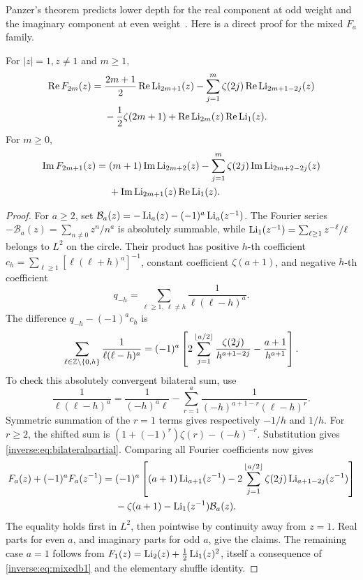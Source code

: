 Panzer's theorem predicts lower depth for the real component at odd
weight and the imaginary component at even weight~\cite{Panzer2017}.
Here is a direct proof for the mixed \(F_a\) family.

\begin{theorem}\label{inverse:thm:mixedparity}
For \(|z|=1,z\ne1\) and \(m\ge1\),
\begin{align}
\operatorname{Re} F_{2m}(z)
={}&\frac{2m+1}{2}\operatorname{Re}\operatorname{Li}_{2m+1}(z)
 -\sum_{j=1}^{m}\zeta(2j)\operatorname{Re}\operatorname{Li}_{2m+1-2j}(z)\notag\\
&-\frac12\zeta(2m+1)
 +\operatorname{Re}\operatorname{Li}_{2m}(z)\operatorname{Re}\operatorname{Li}_1(z).
\label{inverse:eq:realparity}
\end{align}
For \(m\ge0\),
\begin{align}
\operatorname{Im} F_{2m+1}(z)
={}&(m+1)\operatorname{Im}\operatorname{Li}_{2m+2}(z)
 -\sum_{j=1}^{m}\zeta(2j)\operatorname{Im}\operatorname{Li}_{2m+2-2j}(z)\notag\\
&+\operatorname{Im}\operatorname{Li}_{2m+1}(z)\operatorname{Re}\operatorname{Li}_1(z).
\label{inverse:eq:imagparity}
\end{align}
\end{theorem}
\begin{proof}
For \(a\ge2\), set
\(\mathcal B_a(z)=-\operatorname{Li}_a(z)-(-1)^a\operatorname{Li}_a(z^{-1})\).
The Fourier series
\(-\mathcal B_a(z)=\sum_{n\ne0}z^n/n^a\) is absolutely summable,
while \(\operatorname{Li}_1(z^{-1})=\sum_{\ell\ge1}z^{-\ell}/\ell\) belongs to
\(L^2\) on the circle. Their product has positive \(h\)-th coefficient
\(c_h=\sum_{\ell\ge1}[\ell(\ell+h)^a]^{-1}\), constant coefficient
\(\zeta(a+1)\), and negative \(h\)-th coefficient
\[
q_{-h}=\sum_{\ell\ge1,\ \ell\ne h}\frac1{\ell(\ell-h)^a}.
\]
The difference \(q_{-h}-(-1)^a c_h\) is
\begin{equation}
\sum_{\ell\in\mathbb{Z}\setminus\{0,h\}}\frac1{\ell(\ell-h)^a}
=(-1)^a\left[
 2\sum_{j=1}^{\lfloor a/2\rfloor}
       \frac{\zeta(2j)}{h^{a+1-2j}}
 -\frac{a+1}{h^{a+1}}\right].
\label{inverse:eq:bilateralpartial}
\end{equation}
To check this absolutely convergent bilateral sum, use
\[
\frac1{\ell(\ell-h)^a}
=\frac1{(-h)^a\ell}
 -\sum_{r=1}^{a}\frac1{(-h)^{a+1-r}(\ell-h)^r}.
\]
Symmetric summation of the \(r=1\) terms gives respectively
\(-1/h\) and \(1/h\). For \(r\ge2\), the shifted sum is
\((1+(-1)^r)\zeta(r)-(-h)^{-r}\). Substitution gives
\eqref{inverse:eq:bilateralpartial}.
Comparing all Fourier coefficients now gives
\begin{align}
F_a(z)+(-1)^aF_a(z^{-1})
={}&(-1)^a\left[(a+1)\operatorname{Li}_{a+1}(z^{-1})
 -2\sum_{j=1}^{\lfloor a/2\rfloor}
       \zeta(2j)\operatorname{Li}_{a+1-2j}(z^{-1})\right]\notag\\
&-\zeta(a+1)-\operatorname{Li}_1(z^{-1})\mathcal B_a(z).
\label{inverse:eq:mixedfourier}
\end{align}
The equality holds first in \(L^2\), then pointwise by continuity away
from \(z=1\). Real parts for even \(a\), and imaginary parts for odd
\(a\), give the claims. The remaining case \(a=1\) follows from
\(F_1(z)=\operatorname{Li}_2(z)+\tfrac12\operatorname{Li}_1(z)^2\), itself a consequence of
\eqref{inverse:eq:mixedb1} and the elementary shuffle identity.
\end{proof}

